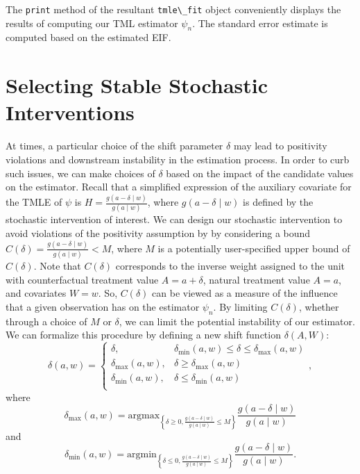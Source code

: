 \documentclass[
  12pt, krantz2,
]{krantz}
\newcommand{\passthrough}[1]{#1}
\newcommand{\1}{\mathbbm{1}}
\theoremstyle{definition}
\theoremstyle{definition}
\theoremstyle{definition}
\theoremstyle{definition}
\theoremstyle{remark}
\begin{document}
The \passthrough{\lstinline!print!} method of the resultant \passthrough{\lstinline!tmle\_fit!} object conveniently displays the
results of computing our TML estimator \(\psi_n\). The standard error estimate
is computed based on the estimated EIF.

\hypertarget{selecting-stable-stochastic-interventions}{%
\section{Selecting Stable Stochastic Interventions}\label{selecting-stable-stochastic-interventions}}

At times, a particular choice of the shift parameter \(\delta\) may lead to
positivity violations and downstream instability in the estimation process. In
order to curb such issues, we can make choices of \(\delta\) based on the impact
of the candidate values on the estimator. Recall that a simplified expression of
the auxiliary covariate for the TMLE of \(\psi\) is \(H = \frac{g(a - \delta \mid w)}{g(a \mid w)}\), where \(g(a - \delta \mid w)\) is defined by the stochastic
intervention of interest. We can design our stochastic intervention to avoid
violations of the positivity assumption by by considering a bound \(C(\delta) = \frac{g(a - \delta \mid w)}{g(a \mid w)} < M\), where \(M\) is a potentially
user-specified upper bound of \(C(\delta)\). Note that \(C(\delta)\) corresponds to
the inverse weight assigned to the unit with counterfactual treatment value \(A = a + \delta\), natural treatment value \(A = a\), and covariates \(W = w\). So,
\(C(\delta)\) can be viewed as a measure of the influence that a given observation
has on the estimator \(\psi_n\). By limiting \(C(\delta)\), whether through a choice
of \(M\) or \(\delta\), we can limit the potential instability of our estimator. We
can formalize this procedure by defining a new shift function \(\delta(A, W)\):
\begin{equation}
  \delta(a, w) =
    \begin{cases}
      \delta, & \delta_{\text{min}}(a,w) \leq \delta \leq
        \delta_{\text{max}}(a,w) \\
      \delta_{\text{max}}(a,w), & \delta \geq \delta_{\text{max}}(a,w) \\
      \delta_{\text{min}}(a,w), & \delta \leq \delta_{\text{min}}(a,w) \\
    \end{cases},
    \label{eq:delta-min-max-shift}
\end{equation}
where \[\delta_{\text{max}}(a, w) = \text{argmax}_{\left\{\delta \geq 0,
\frac{g(a - \delta \mid w)}{g(a \mid w)} \leq M \right\}} \frac{g(a - \delta
\mid w)}{g(a \mid w)}\] and
\[\delta_{\text{min}}(a, w) = \text{argmin}_{\left\{\delta \leq 0,
\frac{g(a - \delta \mid w)}{g(a \mid w)} \leq M \right\}} \frac{g(a - \delta
\mid w)}{g(a \mid w)}.\]
\end{document}
